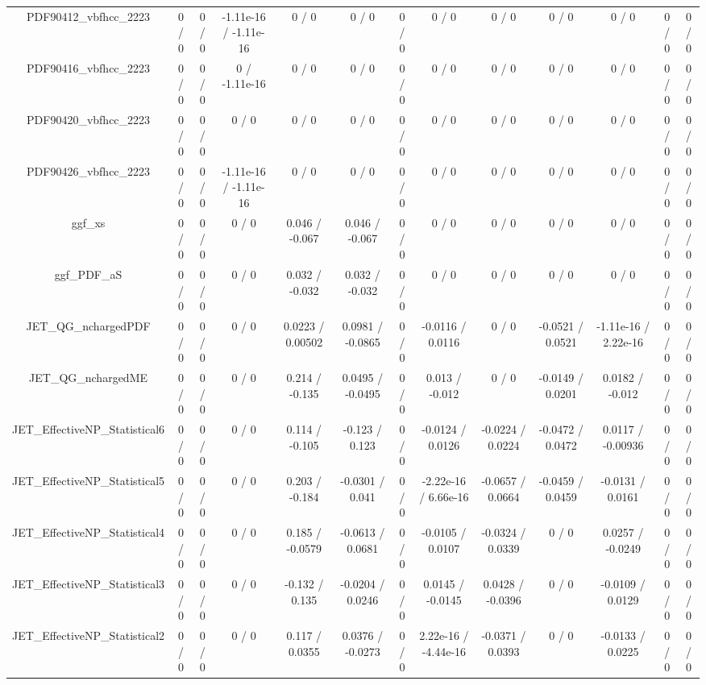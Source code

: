 \documentclass[10pt]{article}
\begin{document}
\begin{table}[htbp]
\begin{center}
\begin{tabular}{|c|c|c|c|c|c|c|c|c|c|c|c|c|}
  PDF90412_vbfhcc_2223 & 0 / 0 & 0 / 0 & -1.11e-16 / -1.11e-16 & 0 / 0 & 0 / 0 & 0 / 0 & 0 / 0 & 0 / 0 & 0 / 0 & 0 / 0 & 0 / 0 & 0 / 0 \\ 
  PDF90416_vbfhcc_2223 & 0 / 0 & 0 / 0 & 0 / -1.11e-16 & 0 / 0 & 0 / 0 & 0 / 0 & 0 / 0 & 0 / 0 & 0 / 0 & 0 / 0 & 0 / 0 & 0 / 0 \\ 
  PDF90420_vbfhcc_2223 & 0 / 0 & 0 / 0 & 0 / 0 & 0 / 0 & 0 / 0 & 0 / 0 & 0 / 0 & 0 / 0 & 0 / 0 & 0 / 0 & 0 / 0 & 0 / 0 \\ 
  PDF90426_vbfhcc_2223 & 0 / 0 & 0 / 0 & -1.11e-16 / -1.11e-16 & 0 / 0 & 0 / 0 & 0 / 0 & 0 / 0 & 0 / 0 & 0 / 0 & 0 / 0 & 0 / 0 & 0 / 0 \\ 
  ggf_xs & 0 / 0 & 0 / 0 & 0 / 0 & 0.046 / -0.067 & 0.046 / -0.067 & 0 / 0 & 0 / 0 & 0 / 0 & 0 / 0 & 0 / 0 & 0 / 0 & 0 / 0 \\ 
  ggf_PDF_aS & 0 / 0 & 0 / 0 & 0 / 0 & 0.032 / -0.032 & 0.032 / -0.032 & 0 / 0 & 0 / 0 & 0 / 0 & 0 / 0 & 0 / 0 & 0 / 0 & 0 / 0 \\ 
  JET_QG_nchargedPDF & 0 / 0 & 0 / 0 & 0 / 0 & 0.0223 / 0.00502 & 0.0981 / -0.0865 & 0 / 0 & -0.0116 / 0.0116 & 0 / 0 & -0.0521 / 0.0521 & -1.11e-16 / 2.22e-16 & 0 / 0 & 0 / 0 \\ 
  JET_QG_nchargedME & 0 / 0 & 0 / 0 & 0 / 0 & 0.214 / -0.135 & 0.0495 / -0.0495 & 0 / 0 & 0.013 / -0.012 & 0 / 0 & -0.0149 / 0.0201 & 0.0182 / -0.012 & 0 / 0 & 0 / 0 \\ 
  JET_EffectiveNP_Statistical6 & 0 / 0 & 0 / 0 & 0 / 0 & 0.114 / -0.105 & -0.123 / 0.123 & 0 / 0 & -0.0124 / 0.0126 & -0.0224 / 0.0224 & -0.0472 / 0.0472 & 0.0117 / -0.00936 & 0 / 0 & 0 / 0 \\ 
  JET_EffectiveNP_Statistical5 & 0 / 0 & 0 / 0 & 0 / 0 & 0.203 / -0.184 & -0.0301 / 0.041 & 0 / 0 & -2.22e-16 / 6.66e-16 & -0.0657 / 0.0664 & -0.0459 / 0.0459 & -0.0131 / 0.0161 & 0 / 0 & 0 / 0 \\ 
  JET_EffectiveNP_Statistical4 & 0 / 0 & 0 / 0 & 0 / 0 & 0.185 / -0.0579 & -0.0613 / 0.0681 & 0 / 0 & -0.0105 / 0.0107 & -0.0324 / 0.0339 & 0 / 0 & 0.0257 / -0.0249 & 0 / 0 & 0 / 0 \\ 
  JET_EffectiveNP_Statistical3 & 0 / 0 & 0 / 0 & 0 / 0 & -0.132 / 0.135 & -0.0204 / 0.0246 & 0 / 0 & 0.0145 / -0.0145 & 0.0428 / -0.0396 & 0 / 0 & -0.0109 / 0.0129 & 0 / 0 & 0 / 0 \\ 
  JET_EffectiveNP_Statistical2 & 0 / 0 & 0 / 0 & 0 / 0 & 0.117 / 0.0355 & 0.0376 / -0.0273 & 0 / 0 & 2.22e-16 / -4.44e-16 & -0.0371 / 0.0393 & 0 / 0 & -0.0133 / 0.0225 & 0 / 0 & 0 / 0 \\ 

\end{tabular}
\end{center}
\end{table}
\end{document}
